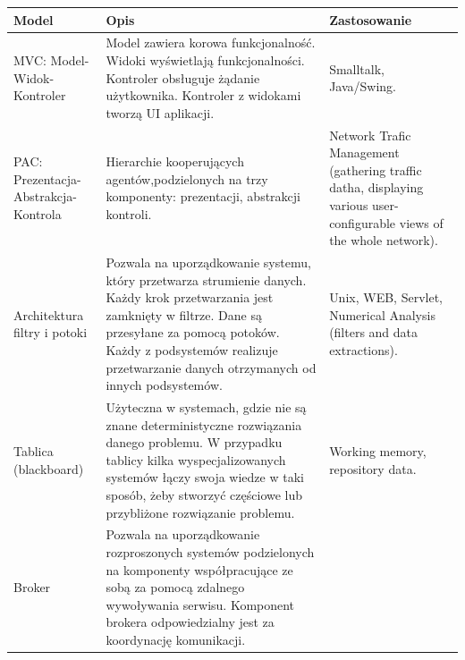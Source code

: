 \documentclass[a4paper]{article}
\begin{document}
    \begin{table}[H]
        \begin{center}
            \begin{tabular}{ p{} p{} p{}}
                \toprule
                Model & Opis & Zastosowanie\\
                \toprule

                MVC: Model-Widok-Kontroler
                &
                Model zawiera korowa funkcjonalność. Widoki wyświetlają funkcjonalności. Kontroler obsługuje żądanie użytkownika. Kontroler z widokami tworzą UI aplikacji.
                &
                Smalltalk, Java/Swing.\\

                \cmidrule(l){1-3}

                PAC: Prezentacja-Abstrakcja-Kontrola
                &
                Hierarchie kooperujących agentów,podzielonych na trzy komponenty: prezentacji, abstrakcji kontroli.
                &
                Network Trafic Management (gathering traffic datha, displaying various user-configurable
                views of the whole network).\\

                \cmidrule(l){1-3}

                Architektura filtry i potoki
                &
                Pozwala na uporządkowanie systemu, który przetwarza strumienie danych. Każdy krok przetwarzania jest zamknięty w filtrze.
                Dane są przesyłane za pomocą potoków. Każdy z podsystemów realizuje przetwarzanie danych otrzymanych od innych podsystemów.
                &
                Unix, WEB, Servlet, Numerical Analysis (filters and data extractions).\\

                \cmidrule(l){1-3}

                Tablica (blackboard)
                &
                Użyteczna w systemach, gdzie nie są znane deterministyczne rozwiązania danego problemu. W przypadku tablicy kilka wyspecjalizowanych
                systemów łączy swoja wiedze w taki sposób, żeby stworzyć częściowe lub przybliżone rozwiązanie problemu.
                &
                Working memory, repository data.\\

                \cmidrule(l){1-3}

                Broker
                &
                Pozwala na uporządkowanie rozproszonych systemów podzielonych na komponenty współpracujące ze sobą za pomocą zdalnego wywoływania
                serwisu. Komponent brokera odpowiedzialny jest za koordynację komunikacji.
                & \\


\end{tabular}
\end{center}
\end{table}
\end{document}
